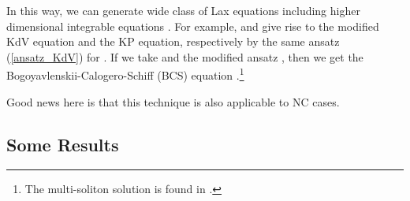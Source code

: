 \documentclass[a4paper,12pt]{article}\setlength{\topmargin}{-1cm}
\begin{document}
In this way, we can generate wide class of Lax equations 
including higher dimensional integrable equations \cite{ToYu}.
For example, \coordHE{} and 
\coordHE{} give rise to 
the modified KdV equation and the KP equation, respectively 
by the same ansatz (\ref{ansatz_KdV}) for \coordHE{}.
If we take \coordHE{} and 
the modified ansatz \coordHE{},
then we get the Bogoyavlenskii-Calogero-Schiff (BCS) 
equation \cite{BoSc}.\footnote{The multi-soliton solution 
is found in \cite{YTSF}.}

Good news here is that this technique is also applicable to
NC cases.

\subsection{Some Results}
\end{document}
